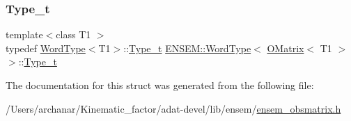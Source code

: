 \subsubsection{\texorpdfstring{Type\_t}{Type\_t}\hspace{0.1cm}{\footnotesize\ttfamily [3/3]}}
{\footnotesize\ttfamily template$<$class T1 $>$ \\
typedef \mbox{\hyperlink{structENSEM_1_1WordType}{Word\+Type}}$<$T1$>$\+::\mbox{\hyperlink{structENSEM_1_1WordType_3_01OMatrix_3_01T1_01_4_01_4_a37e42971b324dfc3027d9f416e3d7d00}{Type\+\_\+t}} \mbox{\hyperlink{structENSEM_1_1WordType}{E\+N\+S\+E\+M\+::\+Word\+Type}}$<$ \mbox{\hyperlink{classENSEM_1_1OMatrix}{O\+Matrix}}$<$ T1 $>$ $>$\+::\mbox{\hyperlink{structENSEM_1_1WordType_3_01OMatrix_3_01T1_01_4_01_4_a37e42971b324dfc3027d9f416e3d7d00}{Type\+\_\+t}}}



The documentation for this struct was generated from the following file\+:\begin{DoxyCompactItemize}
\item 
/\+Users/archanar/\+Kinematic\+\_\+factor/adat-\/devel/lib/ensem/\mbox{\hyperlink{adat-devel_2lib_2ensem_2ensem__obsmatrix_8h}{ensem\+\_\+obsmatrix.\+h}}\end{DoxyCompactItemize}
